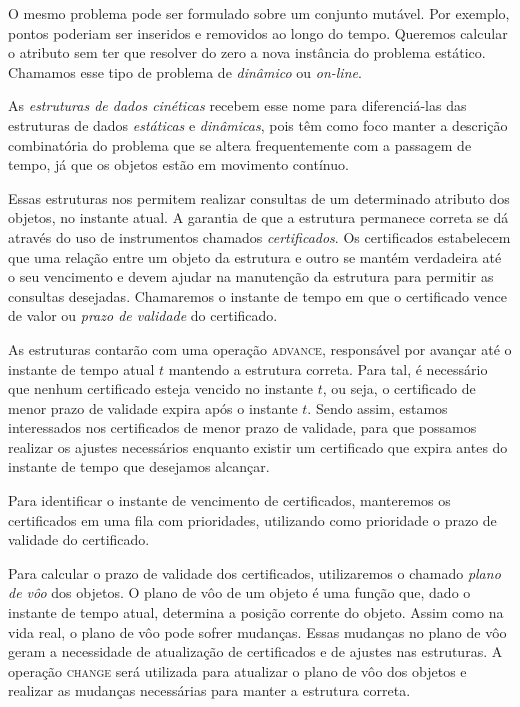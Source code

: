 O mesmo problema pode ser formulado sobre um conjunto mutável.
Por exemplo, pontos poderiam ser inseridos e removidos ao longo do tempo.
Queremos calcular o atributo sem ter que resolver do zero a nova instância do problema estático.
Chamamos esse tipo de problema de \textit{dinâmico} ou \textit{on-line}.

As \emph{estruturas de dados cinéticas} recebem esse nome para diferenciá-las
das estruturas de dados \textit{estáticas} e \textit{dinâmicas}, pois têm como
foco manter a descrição combinatória do problema que se altera frequentemente
com a passagem de tempo, já que os objetos estão em movimento contínuo.

Essas estruturas nos permitem realizar consultas de um determinado atributo dos
objetos, no instante atual.
A garantia de que a estrutura permanece correta se dá através do uso de instrumentos chamados \textit{certificados}.
Os certificados estabelecem que uma relação entre um objeto da estrutura e outro se
mantém verdadeira até o seu vencimento e devem ajudar na manutenção da estrutura
para permitir as consultas desejadas.
Chamaremos o instante de tempo em que o certificado vence de valor ou
\textit{prazo de validade} do certificado.

As estruturas contarão com uma operação \textsc{advance}, responsável por
avançar até o instante de tempo atual $t$ mantendo a estrutura correta.
Para tal, é necessário que nenhum certificado esteja vencido no instante $t$, ou seja, o
certificado de menor prazo de validade expira após o instante $t$.
Sendo assim, estamos interessados nos certificados de menor prazo de validade, para que
possamos realizar os ajustes necessários enquanto existir um certificado que
expira antes do instante de tempo que desejamos alcançar.

Para identificar o instante de vencimento de certificados, manteremos os certificados em uma fila
com prioridades, utilizando como prioridade o prazo de validade do certificado.

Para calcular o prazo de validade dos certificados, utilizaremos o chamado
\textit{plano de vôo} dos objetos.
O plano de vôo de um objeto é uma função que, dado o instante de tempo atual, determina a posição
corrente do objeto.
Assim como na vida real, o plano de vôo pode sofrer mudanças.
Essas mudanças no plano de vôo geram a necessidade de atualização de certificados
e de ajustes nas estruturas.
A operação \textsc{change} será utilizada para atualizar o plano de vôo dos
objetos e realizar as mudanças necessárias para manter a estrutura correta.

